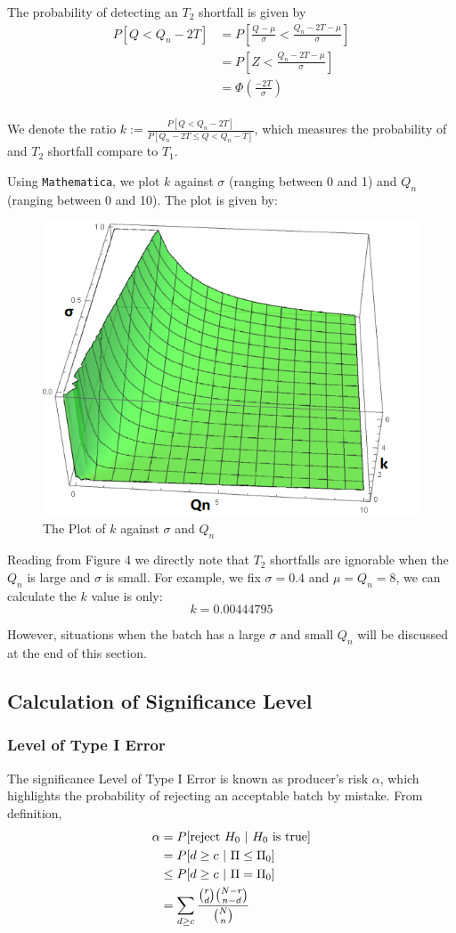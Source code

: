 \documentclass[a4paper]{article}
\begin{document}
The probability of detecting an $T_2$ shortfall is given by
\begin{align*}
P[Q < Q_n-2T]
&= P[\frac{Q-\mu}{\sigma}<\frac{Q_n-2T-\mu}{\sigma}]\\
&= P[Z<\frac{Q_n-2T-\mu}{\sigma}]\\
&= \Phi(\frac{-2T}{\sigma})\\
\end{align*}

We denote the ratio $k:=\displaystyle\frac{P[Q < Q_n-2T]}{P[Q_n-2T \leq Q < Q_n-T]}$, which measures the probability of and $T_2$ shortfall compare to $T_1$. 

\newpage

Using \texttt{Mathematica}, we plot $k$ against $\sigma$ (ranging between 0 and 1) and $Q_n$ (ranging between 0 and 10). The plot is given by:

\begin{figure}[!htbp] 
\centering 
\includegraphics[width=0.6\linewidth]{T12.png}  
\caption{The Plot of $k$ against $\sigma$ and $Q_n$} 
\label{fig1}
\end{figure}

Reading from Figure 4 we directly note that $T_2$ shortfalls are ignorable when the $Q_n$ is large and $\sigma$ is small. For example, we fix $\sigma=0.4$ and $\mu=Q_n=8$, we can calculate the $k$ value is only:
$$k = 0.00444795$$

However, situations when the batch has a large $\sigma$ and small $Q_n$ will be discussed at the end of this section.

\subsection{Calculation of Significance Level}
\subsubsection{Level of Type I Error}
The significance Level of Type I Error is known as producer's risk $\alpha$, which highlights the probability of rejecting an acceptable batch by mistake. From definition,
\begin{align*}
\alpha
&= P[\text{reject }H_0\ |\ H_0 \text{ is true}]\\
&= P[d\geq c\ |\ \Pi\leq \Pi_0]\\
&\leq P[d\geq c\ |\ \Pi = \Pi_0]\\
&= \sum_{d\geq c} \displaystyle\frac{\tbinom{r}{d}\tbinom{N-r}{n-d}}{\tbinom{N}{n}}
\end{align*}
\end{document}
